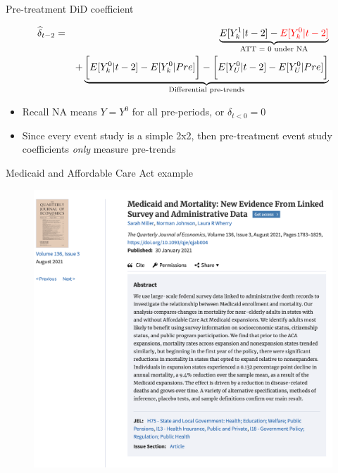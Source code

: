 \documentclass{beamer}
\begin{document}
\begin{frame}{Pre-treatment DiD coefficient}

\begin{eqnarray*}
\widehat{\delta}_{t-2} &=& \underbrace{E[Y^1_k | t-2] - \textcolor{red}{E[Y^0_k | t-2]}}_{\mathclap{\text{ATT = 0 under NA}}} \\
&& + \underbrace{\bigg[ E[Y^0_k | t-2] - E[Y^0_k | Pre] \bigg] - \bigg[ E[Y^0_U | t-2] - E[Y^0_U | Pre] \bigg]}_{\mathclap{\text{Differential pre-trends}}}
\end{eqnarray*}
\bigskip

\begin{itemize}
\item Recall NA means $Y=Y^0$ for all pre-periods, or $\delta_{t<0}=0$
\item Since every event study is a simple 2x2, then pre-treatment event study coefficients \emph{only} measure pre-trends
\end{itemize}


\end{frame}




\begin{frame}{Medicaid and Affordable Care Act example}

\begin{figure}
\includegraphics[scale=0.25]{./lecture_includes/medicaid_qje}
\end{figure}

\end{frame}
\end{document}
